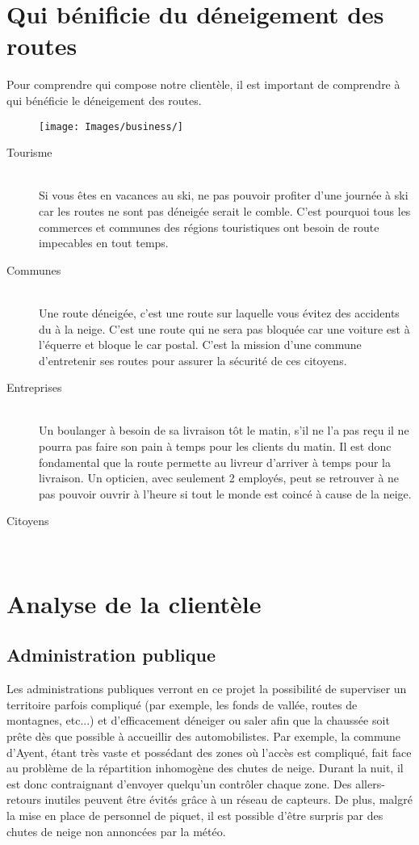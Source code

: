 \section{Qui bénificie du déneigement des routes}
Pour comprendre qui compose notre clientèle, il est important de comprendre à qui
bénéficie le déneigement des routes.

\begin{figure}[H]
    \centering
    \texttt{[image: Images/business/]}
\end{figure}

\begin{description}
    \item[Tourisme] \hfill \\
    Si vous êtes en vacances au ski, ne pas pouvoir profiter d'une journée à ski car
    les routes ne sont pas déneigée serait le comble. C'est pourquoi tous les commerces
    et communes des régions touristiques ont besoin de route impecables en tout temps.
    \item[Communes] \hfill \\
    Une route déneigée, c'est une route sur laquelle vous évitez des accidents du à la neige.
    C'est une route qui ne sera pas bloquée car une voiture est à l'équerre et bloque le car postal.
    C'est la mission d'une commune d'entretenir ses routes pour assurer la sécurité de ces citoyens.
    \item[Entreprises] \hfill \\
    Un boulanger à besoin de sa livraison tôt le matin, s'il ne l'a pas reçu il ne pourra
    pas faire son pain à temps pour les clients du matin. Il est donc fondamental que la route
    permette au livreur d'arriver à temps pour la livraison.
    Un opticien, avec seulement 2 employés, peut se retrouver à ne pas pouvoir ouvrir à l'heure
    si tout le monde est coincé à cause de la neige.
    \item[Citoyens] \hfill \\    
     
\end{description}

\section{Analyse de la clientèle}
\subsection{Administration publique}
Les administrations publiques verront en ce projet la possibilité de superviser
un territoire parfois compliqué (par exemple, les fonds de vallée,
routes de montagnes, etc...) et d'efficacement déneiger ou saler
afin que la chaussée soit prête dès que possible à accueillir des automobilistes.
Par exemple, la commune d'Ayent, étant très vaste et possédant des zones
où l'accès est compliqué, fait face au problème de la répartition inhomogène
des chutes de neige. Durant la nuit, il est donc contraignant d'envoyer
quelqu'un contrôler chaque zone. Des allers-retours inutiles peuvent être
évités grâce à un réseau de capteurs.
De plus, malgré la mise en place de personnel de piquet, il est possible
d'être surpris par des chutes de neige non annoncées par la météo.


